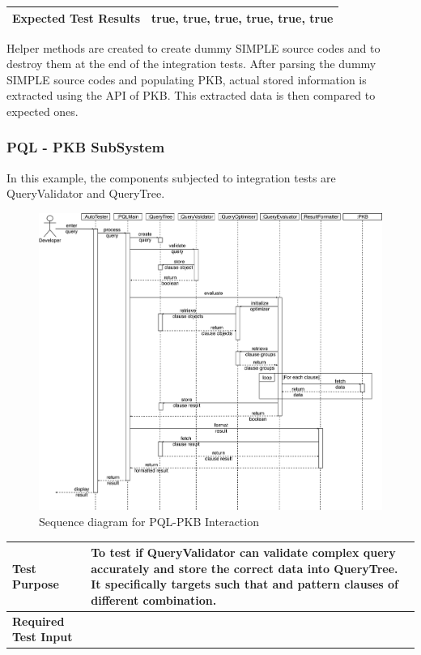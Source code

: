 \documentclass[12pt]{article}
\begin{document}
{{{{{{{{{{{{{\begin{longtable}{|p{5cm} | p{12cm}| }
 \\\hline
   \textbf{ Expected Test Results} &
true, true, true, true, true, true \\\hline
\end{longtable}
Helper methods are created to create dummy SIMPLE source codes and to destroy them at the end of the integration tests.
\newline
After parsing the dummy SIMPLE source codes and populating PKB, actual stored information is extracted using the API of PKB. This extracted data is then compared to expected ones.

\subsubsection{PQL - PKB SubSystem}
In this example, the components subjected to integration tests are QueryValidator and QueryTree.
\begin{figure}[H]
  \centering 
  \caption{Sequence diagram for PQL-PKB Interaction}
 \includegraphics[width=1.0\textwidth]{PQL-PKB.png}
\end{figure}
\begin{longtable}{|p{5cm} | p{12cm}| }
\hline
\textbf{Test Purpose} &
To test if QueryValidator can validate complex query accurately and store the correct data into QueryTree. It specifically targets such that and pattern clauses of different combination.
\\\hline
\textbf{Required Test Input}
 &
\footnotesize
 \texttt{
}
\end{longtable}}}}}}}}}}}}}}
\end{document}
